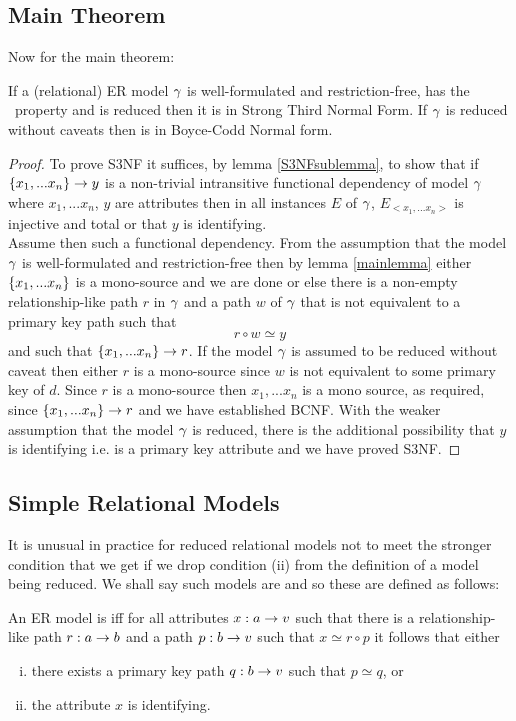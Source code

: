 \subsection{Main Theorem}
\noindent Now for the main theorem:
\begin{theorem}
\label{maintheorem}
\noindent If a (relational) ER model $\gamma$ is well-formulated and restriction-free, has the \fdfactoring\ property and is reduced then it is in Strong Third Normal Form. 
If  $\gamma$ is reduced without caveats then is in Boyce-Codd Normal form.
\end{theorem}
\begin{proof}
To prove S3NF it suffices, by lemma \ref{S3NFsublemma},  to show that if 
$\left\{x_1,...x_n\right\} \rightarrow y$ is a non-trivial intransitive functional dependency of model $\gamma$
where $x_1,...x_n$, $y$ are attributes 
then  in all instances
$E$ of $\gamma$, $E_{<x_1,...x_n>}$ is injective and total or that $y$
is identifying. \\
Assume then such a functional dependency.
From the assumption that the model $\gamma$ is well-formulated and restriction-free
then by lemma \ref{mainlemma} 
either $\left\{x_1,...x_n\right\}$ is a mono-source and we are done
or else there is a non-empty relationship-like path $r$ in $\gamma$
and a path $w$ of $\gamma$ that is not  equivalent to a primary key path such that
\begin{equation}
\label{simpleRepresentation}
 r \circ w \simeq y
\end{equation}
and such that $\left\{x_1,...x_n\right\} \rightarrow r$.
If the model $\gamma$ is assumed to be reduced without caveat then either $r$ is a mono-source since $w$ is not equivalent to some primary key of $d$.
Since $r$ is a mono-source then $x_1,...x_n$ is a mono source, as required, since $\left\{x_1,...x_n\right\} \rightarrow r$  and we have established BCNF.
With the weaker assumption that the model $\gamma$ is reduced, there is the additional possibility that $y$ is identifying i.e. is a primary key attribute and we have proved S3NF.
\end{proof}

\subsection{Simple Relational Models}
It is unusual in practice for reduced relational models not to meet the stronger condition that we get if we drop condition (ii) from the definition of a model being reduced. We shall say such models are  and so these are defined as follows:
\begin{definition} 
An  ER model is  iff for all attributes $x:a \rightarrow v$
such that there is a relationship-like path $r:a \rightarrow b$ and a path $p:b \rightarrow v$ such that
$x \simeq r \circ p$ it follows that 
either 
\begin{enumerate} [(i)]
\item there exists a primary key path  $q:b \rightarrow v$ such that $p \simeq q$, or
\item the attribute $x$ is identifying.
\end{enumerate}
\end{definition}

